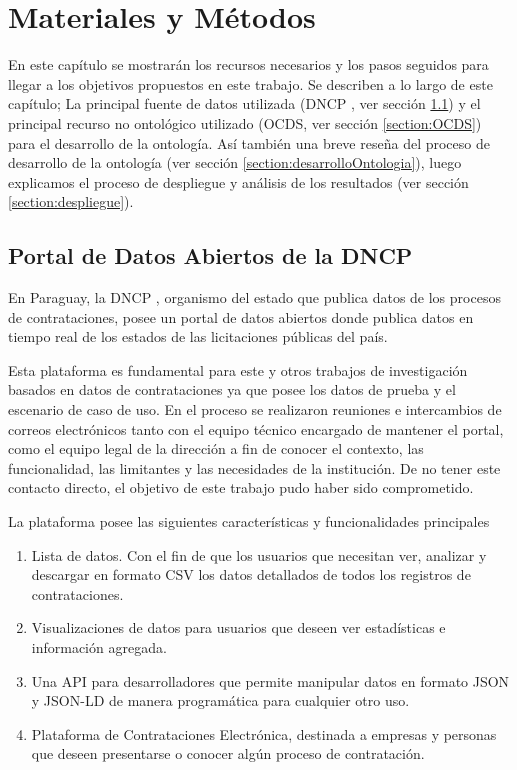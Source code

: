 \chapter{Materiales y Métodos}
\label{chap:MaterialesYMetodos}

En este capítulo se mostrarán los recursos necesarios y los pasos seguidos para llegar a los objetivos propuestos en este trabajo. Se describen a lo largo de este capítulo; La principal fuente de datos utilizada (DNCP \cite{DatosAbiDNCP:online}, ver sección \ref{section:portalDNCP}) y el principal recurso no ontológico utilizado (OCDS, ver sección \ref{section:OCDS}) para el desarrollo de la ontología. Así también una breve reseña del proceso de desarrollo de la ontología (ver sección \ref{section:desarrolloOntologia}), luego explicamos el proceso de despliegue y análisis de los resultados (ver sección \ref{section:despliegue}).

\section{Portal de Datos Abiertos de la DNCP}
\label{section:portalDNCP}

En Paraguay, la DNCP \cite{DatosAbiDNCP:online}, organismo del estado que publica datos de los procesos de contrataciones, posee un portal de datos abiertos donde publica datos en tiempo real de los estados de las licitaciones públicas del país. 

Esta plataforma es fundamental para este y otros trabajos de investigación basados en datos de contrataciones ya que posee los datos de prueba y el escenario de caso de uso. En el proceso se realizaron reuniones e intercambios de correos electrónicos tanto con el equipo técnico encargado de mantener el portal, como el equipo legal de la dirección a fin de conocer el contexto, las funcionalidad, las limitantes y las necesidades de la institución. De no tener este contacto directo, el objetivo de este trabajo pudo haber sido comprometido.

La plataforma posee las siguientes características y funcionalidades principales

\begin{enumerate}
    \item Lista de datos. Con el fin de que los usuarios que necesitan ver, analizar y descargar en formato CSV los datos detallados de todos los registros de contrataciones.
    \item Visualizaciones de datos para usuarios que deseen ver estadísticas e información agregada.
    \item Una API para desarrolladores que permite manipular datos en formato JSON y JSON-LD de manera programática para cualquier otro uso.
    \item Plataforma de Contrataciones Electrónica, destinada a empresas y personas que deseen presentarse o conocer algún proceso de contratación.
\end{enumerate}

